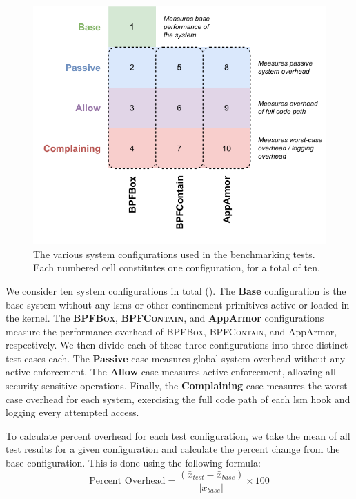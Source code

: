 \documentclass[
  fontsize=12pt,
  titlepage=firstiscover,
  paper=letter,
oneside,
  cleardoublepage=plain,
  parskip=half-,
  DIV=10,
  parindent,
  appendixprefix,
  chapterprefix,
  listof=totoc,
]{scrbook}
\newcommand{\bpfbox}{\textsc{BPFBox}}
\newcommand{\bpfcontain}{\textsc{BPFContain}}
\begin{document}
\begin{figure}[htp]
  \centering
  \includegraphics[width=0.8\linewidth]{figs/eval/configuration.pdf}
  \caption[Benchmarking system configurations]{
    The various system configurations used in the benchmarking tests.
    Each numbered cell constitutes one configuration, for a total of ten.
  }\label{fig:configuration}
\end{figure}

We consider ten system configurations in total (). The
\textbf{Base} configuration is the base system without any \glspl{lsm} or other
confinement primitives active or loaded in the kernel. The \textbf{\bpfbox},
\textbf{\bpfcontain}, and \textbf{AppArmor} configurations measure the performance
overhead of \bpfbox{}, \bpfcontain{}, and AppArmor, respectively. We then divide each of
these three configurations into three distinct test cases each. The \textbf{Passive} case
measures global system overhead without any active enforcement. The \textbf{Allow} case
measures active enforcement, allowing all security-sensitive operations. Finally, the
\textbf{Complaining} case measures the worst-case overhead for each system, exercising the
full code path of each \gls{lsm} hook and logging every attempted access.

To calculate percent overhead for each test configuration, we take the mean of all
test results for a given configuration and calculate the percent change from
the base configuration. This is done using the following formula:
$$
  \text{Percent Overhead} = \frac{\left(\bar{x}_{test} - \bar{x}_{base}\right)}{|\bar{x}_{base}|} \times 100
$$
\end{document}
